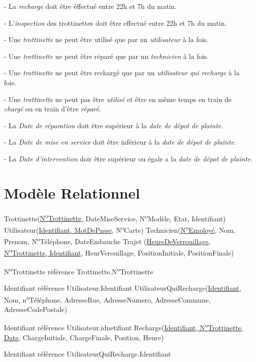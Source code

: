 \documentclass{article}
\newcommand\tab[1][1cm]{\hspace*{#1}}
\begin{document}
- La \textit{recharge} doit être éffectué entre 22h et 7h du matin.

- L'\textit{inspection} des trottinettes doit être effectué entre 22h et 7h du matin.

- Une \textit{trottinette} ne peut être utilisé que par un \textit{utilisateur} à la fois.

- Une \textit{trottinette} ne peut être réparé que par un \textit{technicien} à la fois.

- Une \textit{trottinette} ne peut être rechargé que par un \textit{utilisateur qui recharge} à la fois.

- Une \textit{trottinette} ne peut pas être \textit{utilisé} et être en même temps en train de \textit{chargé} ou en train d'être \textit{réparé}.

- La \textit{Date de réparation} doit être supérieur à la \textit{date de dépot de plainte}.

- La \textit{Date de mise en service} doit être inférieur à la \textit{date de dépot de plainte}.

- La \textit{Date d'intervention} doir être supérieur ou égale a la \textit{date de dépot de plainte}.


\section{Modèle Relationnel}
Trottinette(\underline{N\textsuperscript{o}Trottinette}, DateMiseService, N\textsuperscript{o}Modèle, Etat, Identifiant)
\bigbreak
Utilisateur(\underline{Identifiant, MotDePasse}, N\textsuperscript{o}Carte)
\bigbreak
Technicien(\underline{N\textsuperscript{o}Employé}, Nom, Prenom, N\textsuperscript{o}Téléphone, DateEmbauche
\bigbreak
Trajet (\underline{HeureDeVerrouillage, N\textsuperscript{o}Trottinette, Identifiant}, HeurVerouillage, PositionInitiale, PositionFinale)

\tab N\textsuperscript{o}Trottinette référence Trottinette.N\textsuperscript{o}Trottinette

\tab Identifiant référence Utilisateur.Identifiant
\bigbreak
UtilisateurQuiRecharge(\underline{Identifiant}, Nom, n\textsuperscript{o}Téléphone, AdresseRue, AdresseNumero, AdresseCommune, AdresseCodePostale)

\tab Identifiant référence Utilisateur.idnetifiant
\bigbreak
Recharge(\underline{Identifiant, N\textsuperscript{o}Trottinette, Date}, ChargeInitiale, ChargeFinale, Position, Heure)

\tab Identifiant référence UtilisateurQuiRecharge.Identifiant
\end{document}
